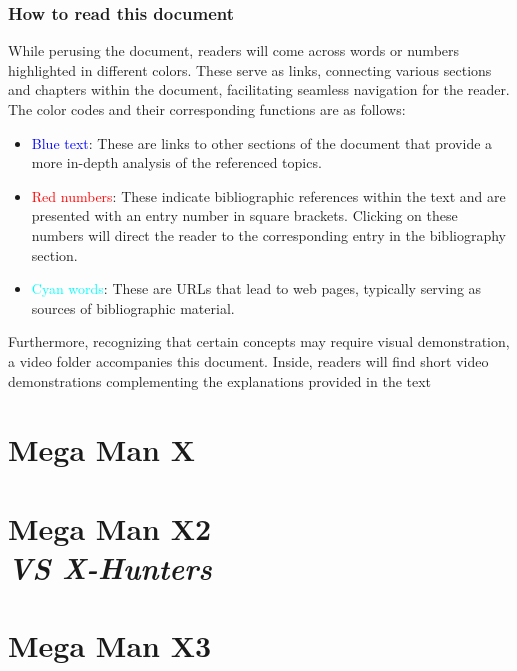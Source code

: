 \documentclass[openany,draft]{report}
\begin{document}
	\section*{How to read this document}
	While perusing the document, readers will come across words or numbers highlighted in different colors. These serve as links, connecting various sections and chapters within the document, facilitating seamless navigation for the reader. The color codes and their corresponding functions are as follows:
	\begin{itemize}
		
	\item \textcolor{blue}{Blue text}: These are links to other sections of the document that provide a more in-depth analysis of the referenced topics.
	
	\item \textcolor{red}{Red numbers}: These indicate bibliographic references within the text and are presented with an entry number in square brackets. Clicking on these numbers will direct the reader to the corresponding entry in the bibliography section.
	
	\item \textcolor{cyan}{Cyan words}: These are URLs that lead to web pages, typically serving as sources of bibliographic material.
	\end{itemize}
	
	Furthermore, recognizing that certain concepts may require visual demonstration, a video folder accompanies this document. Inside, readers will find short video demonstrations complementing the explanations provided in the text
	
\part{Mega Man X}

\label{cha:X1}
%

\part[Mega Man X2]{Mega Man X2\\[2ex]\Large\itshape{VS X-Hunters}}
\label{cha:X2}
%
	
\part{Mega Man X3}
\label{cha:X3}

\end{document}
